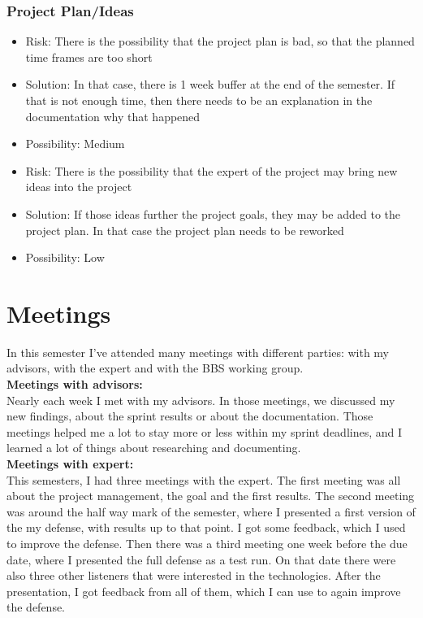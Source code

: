 \documentclass[
	a4paper               %
	,BCOR=0mm            %
	,bibliography=totoc   %
	,listof=totoc         %
	,monolingual
	,twoside=false
]{bfhthesis}              %
\begin{document}
\subsection{Project Plan/Ideas}
\begin{itemize}
	\item Risk: There is the possibility that the project plan is bad, so that the planned time frames are too short
	\item Solution: In that case, there is 1 week buffer at the end of the semester. If that is not enough time, then there needs to be an explanation in the documentation why that happened
	\item Possibility: Medium
\end{itemize}
\begin{itemize}
	\item Risk: There is the possibility that the expert of the project may bring new ideas into the project
	\item Solution: If those ideas further the project goals, they may be added to the project plan. In that case the project plan needs to be reworked
	\item Possibility: Low
\end{itemize}


\chapter{Meetings}
In this semester I've attended many meetings with different parties: with my advisors, with the expert and with the BBS working group.\\

\noindent
\textbf{Meetings with advisors:}\\
Nearly each week I met with my advisors. In those meetings, we discussed my new findings, about the sprint results or about the documentation. Those meetings helped me a lot to stay more or less within my sprint deadlines, and I learned a lot of things about researching and documenting.\\

\noindent
\textbf{Meetings with expert:}\\
This semesters, I had three meetings with the expert. The first meeting was all about the project management, the goal and the first results. The second meeting was around the half way mark of the semester, where I presented a first version of the my defense, with results up to that point. I got some feedback, which I used to improve the defense. Then there was a third meeting one week before the due date, where I presented the full defense as a test run. On that date there were also three other listeners that were interested in the technologies. After the presentation, I got feedback from all of them, which I can use to again improve the defense.\\
\end{document}
